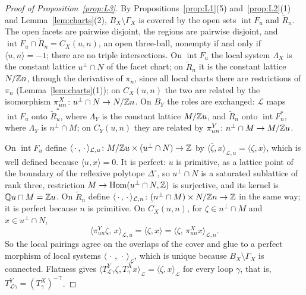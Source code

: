 \begin{proof}[Proof of Proposition~\ref{prop:L3}]
By Propositions~\ref{prop:L1}(5) and~\ref{prop:L2}(1) and Lemma~\ref{lem:charts}(2), $B_X\setminus\Gamma_X$ is covered
by the open sets $\operatorname{int}F_u$ and $\widetilde R_n$. The open facets are pairwise disjoint, the regions are
pairwise disjoint, and $\operatorname{int}F_u\cap\widetilde R_n=C_X(u,n)$, an open three-ball, nonempty if and only if
$\langle u,n\rangle=-1$; there are no triple intersections. On $\operatorname{int}F_u$ the local system $\Lambda_X$ is the
constant lattice $u^\perp\cap N$ of the facet chart; on $\widetilde R_n$ it is the constant lattice $N/\mathbb Z n$, through the
derivative of $\pi_n$, since all local charts there are restrictions of $\pi_n$ (Lemma~\ref{lem:charts}(1)); on
$C_X(u,n)$ the two are related by the isomorphism $\pi^X_{un}\colon u^\perp\cap N\to N/\mathbb Z n$. On $B_Y$ the roles are
exchanged: $\mathcal L$ maps $\operatorname{int}F_u$ onto $\widetilde R^*_u$, where $\Lambda_Y$ is the constant lattice
$M/\mathbb Z u$, and $\widetilde R_n$ onto $\operatorname{int}F^*_n$, where $\Lambda_Y$ is $n^\perp\cap M$; on $C_Y(u,n)$ they
are related by $\pi^Y_{un}\colon n^\perp\cap M\to M/\mathbb Z u$.

On $\operatorname{int}F_u$ define $\langle\,\cdot\,,\,\cdot\,\rangle_{\mathcal L,u}\colon M/\mathbb Z u\times(u^\perp\cap N)\to\mathbb Z$ by $\langle\bar\zeta,x\rangle_{\mathcal L,u}=\langle\zeta,x\rangle$,
which is well defined because $\langle u,x\rangle=0$. It is perfect: $u$ is primitive, as a lattice point of the boundary
of the reflexive polytope $\Delta^\circ$, so $u^\perp\cap N$ is a saturated sublattice of rank three, restriction
$M\to\operatorname{Hom}(u^\perp\cap N,\mathbb Z)$ is surjective, and its kernel is $\mathbb Q u\cap M=\mathbb Z u$. On $\widetilde R_n$ define
$\langle\,\cdot\,,\,\cdot\,\rangle_{\mathcal L,n}\colon(n^\perp\cap M)\times N/\mathbb Z n\to\mathbb Z$ in the same way; it is perfect because $n$ is primitive. On $C_X(u,n)$,
for $\zeta\in n^\perp\cap M$ and $x\in u^\perp\cap N$,
\[
\bigl\langle\pi^Y_{un}\zeta,\,x\bigr\rangle_{\mathcal L,u}=\langle\zeta,x\rangle=\bigl\langle\zeta,\,\pi^X_{un}x\bigr\rangle_{\mathcal L,n}.
\]
So the local pairings agree on the overlaps of the cover and glue to a perfect morphism of local systems $\langle\,\cdot\,,\,\cdot\,\rangle_{\mathcal L}$, which is
unique because $B_X\setminus\Gamma_X$ is connected. Flatness gives $\langle T^Y_{\mathcal L\gamma}\zeta,T^X_\gamma x\rangle_{\mathcal L}=\langle\zeta,x\rangle_{\mathcal L}$ for every loop $\gamma$, that is, $T^Y_{\mathcal L\gamma}=(T^X_\gamma)^{-\top}$.
\end{proof}


